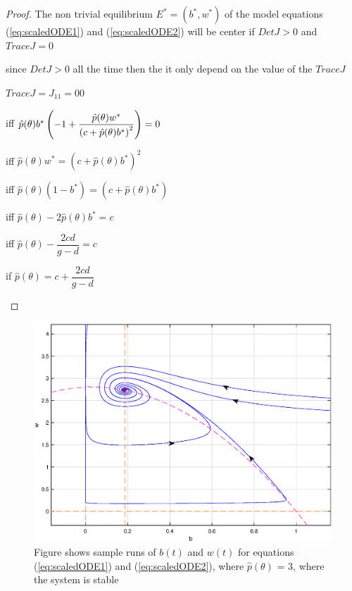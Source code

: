 \documentclass[12pt]{article}
\begin{document}
\begin{proof}
  The non trivial equilibrium $E^{\ast }=(b^{\ast },w^{\ast })$ of the
  model equations (\ref{eq:scaledODE1}) and (\ref{eq:scaledODE2}) will
  be center if $DetJ>0$ and $TraceJ=0$

since $DetJ>0$ all the time then the it only depend on the value of the $%
TraceJ$
\begin{center}
$TraceJ=J_{11}=00$

iff $\hat{p}(\theta )b^{\ast }\left( -1+\dfrac{\hat{p}(\theta )w^{\ast }}{%
\left( c+\hat{p}(\theta )b^{\ast }\right) ^{2}}\right) =0$

iff $\hat{p}(\theta )w^{\ast }=\left( c+\hat{p}(\theta )b^{\ast }\right)
^{2} $

iff $\hat{p}(\theta )\left( 1-b^{\ast }\right) =\left( c+\hat{p}(\theta
)b^{\ast }\right) $

iff $\hat{p}(\theta )-2\hat{p}(\theta )b^{\ast }=c$

iff $\hat{p}(\theta )-\dfrac{2cd}{g-d}=c$

if $\hat{p}(\theta )=c+\dfrac{2cd}{g-d}$
\end{center}

\end{proof}
\begin{figure}[!htp]
\begin{center}
\includegraphics[scale=0.3]{img/s.eps}  

\end{center}

\caption{Figure shows sample runs of $b(t)$ and $w(t)$ for equations
  (\ref{eq:scaledODE1}) and (\ref{eq:scaledODE2}), where
  $\hat{p}(\theta )$ = 3, where the system is stable }
      \label{fig:S}
\end{figure}
\end{document}
